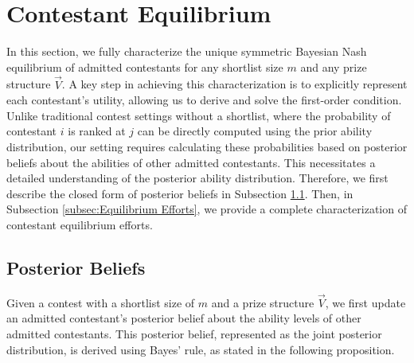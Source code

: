 \section{Contestant Equilibrium}
\label{sec:playerSBNE}
In this section, we fully characterize the unique symmetric Bayesian Nash equilibrium of admitted contestants for any shortlist size $m$ and any prize structure $\vec{V}$. A key step in achieving this characterization is to explicitly represent each contestant's utility, allowing us to derive and solve the first-order condition.
Unlike traditional contest settings without a shortlist, where the probability of contestant $i$ is ranked at $j$ can be directly computed using the prior ability distribution, our setting requires calculating these probabilities based on posterior beliefs about the abilities of other admitted contestants. This necessitates a detailed understanding of the posterior ability distribution. Therefore, we first describe the closed form of posterior beliefs in Subsection \ref{subsec:Posterior Beliefs}. Then, in Subsection \ref{subsec:Equilibrium Efforts}, we provide a complete characterization of contestant equilibrium efforts.

\subsection{Posterior Beliefs}
\label{subsec:Posterior Beliefs}

Given a contest with a shortlist size of $m$ and a prize structure $\vec{V}$, we first update an admitted contestant's posterior belief about the ability levels of other admitted contestants. This posterior belief, represented as the joint posterior distribution, is derived using Bayes' rule, as stated in the following proposition.


